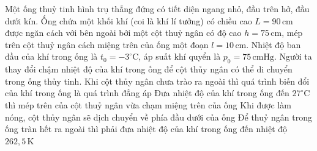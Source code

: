 \documentclass[12pt,a4paper,oneside]{article}
\begin{document}
\begin{ex}
	Một ống thuỷ tinh hình trụ thẳng đứng có tiết diện ngang nhỏ, đầu trên hở, đầu dưới kín. Ống chứa một khối khí (coi là khí lí tưởng) có chiều cao $L = 90\,\text{cm}$ được ngăn cách với bên ngoài bởi một cột thuỷ ngân có độ cao $h = 75\,\text{cm}$, mép trên cột thuỷ ngân cách miệng trên của ống một đoạn $l = 10\,\text{cm}$. Nhiệt độ ban đầu của khí trong ống là $t_0 = -3^{\circ}\text{C}$, áp suất khí quyển là $p_0 = 75\,\text{cmHg}$. Người ta thay đổi chậm nhiệt độ của khí trong ống để cột thủy ngân có thể di chuyển trong ống thủy tinh.
	\choiceTF
	{Khi cột thủy ngân chưa trào ra ngoài thì quá trình biến đổi của khí trong ống là quá trình đẳng áp}
	{Đưa nhiệt độ của khí trong ống đến $27^{\circ}\text{C}$ thì mép trên của cột thuỷ ngân vừa chạm miệng trên của ống}
	{Khi được làm nóng, cột thủy ngân sẽ dịch chuyển về phía đầu dưới của ống}
	{Để thuỷ ngân trong ống tràn hết ra ngoài thì phải đưa nhiệt độ của khí trong ống đến nhiệt độ $262{,}5\,\text{K}$}
\end{ex}
\end{document}

